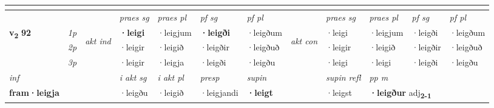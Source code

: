 \begin{longtable}[l]{X>{\footnotesize\itshape}llXXXXlXXXX}
  & \\
   \midrule
 & &   & \textit{praes sg}  & \textit{praes pl}    & \textit{ pf sg} & \textit{pf pl} & & \textit{praes sg}  & \textit{praes pl}    & \textit{pf sg} & \textit{pf pl }  \\ \cmidrule{4-7} \cmidrule{9-12}
 \multirow{2}{*}{{{\textbf{v{\textsubscript{2}}} \Large{\textbf{92}}}}}  & 1p & \multirow{3}{*}{\begin{turn}{90}\textit{akt ind}\end{turn}} & \textbf{·leigi} & ·leigjum & \textbf{·leigði} & ·leigðum & \multirow{3}{*}{\begin{turn}{90}\textit{akt con}\end{turn}} &·leigi & ·leigjum & ·leigði & ·leigðum\\*
 & 2p &  &  ·leigir  & ·leigið & ·leigðir & ·leigðuð & & ·leigir & ·leigið & ·leigðir & ·leigðuð \\*
 & 3p &  & ·leigir & ·leigja & ·leigði & ·leigðu & & ·leigi & ·leigi& ·leigði & ·leigðu \\*
\cmidrule{4-7} \cmidrule{9-12}

   {\textit{inf}} & &  & \textit{i akt sg} & \textit{i akt pl}   & \textit{presp} & \textit{supin} && \textit{supin refl} & \textit{pp m} \\*
  {\textbf{fram\allowbreak ·leigja}} & && ·leigðu  & ·leigið   & ·leigjandi &  \textbf{·leigt} && ·leigst & \multicolumn{2}{l}{\textbf{·leigður} adj\textbf{\textsubscript{2-1}}} \\*

\midrule


\end{longtable}
